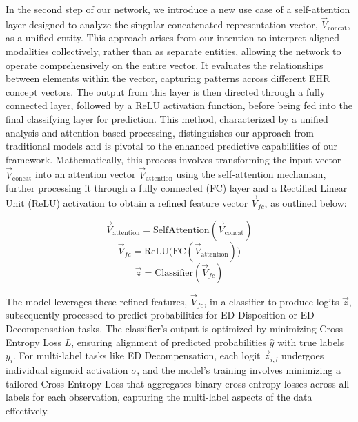 \documentclass{article}
\theoremstyle{plain}
\theoremstyle{definition}
\theoremstyle{remark}
\begin{document}
In the second step of our network, we introduce a new use case of a self-attention layer \citep{vaswani2017attention} designed to analyze the singular concatenated representation vector, $\vec{V}_{\text{concat}}$, as a unified entity. This approach arises from our intention to interpret aligned modalities collectively, rather than as separate entities, allowing the network to operate comprehensively on the entire vector. It evaluates the relationships between elements within the vector, capturing patterns across different EHR concept vectors. 
The output from this layer is then directed through a fully connected layer, followed by a ReLU activation function, before being fed into the final classifying layer for prediction. This method, characterized by a unified analysis and attention-based processing, distinguishes our approach from traditional models and is pivotal to the enhanced predictive capabilities of our framework. Mathematically, this process involves transforming the input vector $\vec{V}_{\text{concat}}$ into an attention vector $\vec{V}_{\text{attention}}$ using the self-attention mechanism, further processing it through a fully connected (FC) layer and a Rectified Linear Unit (ReLU) activation to obtain a refined feature vector $\vec{V}_{fc}$, as outlined below:

\begin{equation}
    \vec{V}_{\text{attention}} = \text{SelfAttention}(\vec{V}_{\text{concat}})
\end{equation}
\begin{equation}
    \vec{V}_{fc} = \text{ReLU(FC}(\vec{V}_{\text{attention}}))
\end{equation}
\begin{equation}
    \vec{z} = \text{Classifier}(\vec{V}_{fc})
\end{equation}

The model leverages these refined features, $\vec{V}_{fc}$, in a classifier to produce logits $\vec{z}$, subsequently processed to predict probabilities for ED Disposition or ED Decompensation tasks. The classifier's output is optimized by minimizing Cross Entropy Loss $L$, ensuring alignment of predicted probabilities $\hat{y}$ with true labels $y_i$. For multi-label tasks like ED Decompensation, each logit $\vec{z}_{i,l}$ undergoes individual sigmoid activation $\sigma$, and the model's training involves minimizing a tailored Cross Entropy Loss that aggregates binary cross-entropy losses across all labels for each observation, capturing the multi-label aspects of the data effectively.
\end{document}
